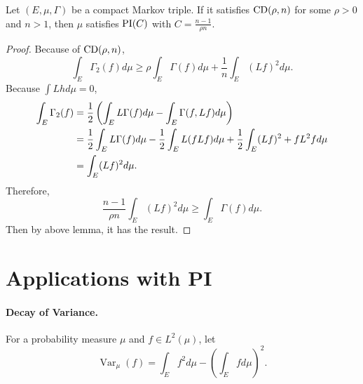 \begin{thm}
    Let $(E,\mu,\Gamma)$ be a compact Markov triple. If it satisfies $\operatorname{CD}(\rho,n)$ for some $\rho > 0$ and $n > 1$, then $\mu$ satisfies $\operatorname{PI}(C)$ with $C =\frac{n-1}{\rho n}$.
\end{thm}
\begin{proof}
    Because of $\operatorname{CD}(\rho,n)$,
    \begin{equation*}
    	\int_E \Gamma_2(f) d \mu \geq \rho \int_E \Gamma(f) d \mu+\frac{1}{n} \int_E(L f)^2 d \mu.
    \end{equation*}
    Because $\int Lh d\mu = 0$,
    \begin{align*}
		\int_E \Gamma_2(f) & =\frac{1}{2} \left(\int_E L \Gamma(f) d \mu-\int_E \Gamma(f, L f) d \mu\right) \\
		& =\frac{1}{2} \int_E L \Gamma(f) d \mu-\frac{1}{2} \int_E L(f L f) d \mu+\frac{1}{2} \int_E(L f)^2+f L^2 f d \mu \\
		& =\int_E(L f)^2 d \mu.
    \end{align*}
    Therefore,
    \begin{equation*}
    	\frac{n-1}{\rho n} \int_E(L f)^2 d \mu \geq  \int_E \Gamma(f) d \mu.
    \end{equation*}
    Then by above lemma, it has the result.
\end{proof}

\section{Applications with PI}

\paragraph{Decay of Variance.} For a probability measure $\mu$ and $f \in L^2(\mu)$, let
\begin{equation*}
	\operatorname{Var}_\mu(f)=\int_E f^2 d \mu-\left(\int_E f d \mu\right)^2.
\end{equation*}

